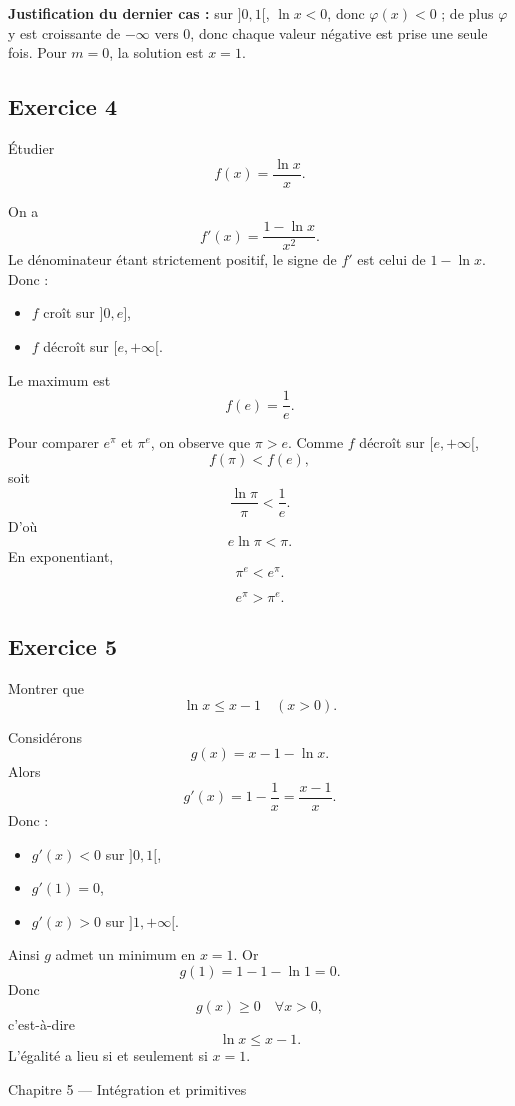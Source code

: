 \documentclass[11pt,a4paper]{article}
\begin{document}
\textbf{Justification du dernier cas :}  
sur \(]0,1[\), \(\ln x<0\), donc \(\varphi(x)<0\) ; de plus \(\varphi\) y est croissante de \(-\infty\) vers \(0\), donc chaque valeur négative est prise une seule fois. Pour \(m=0\), la solution est \(x=1\).

\subsection*{Exercice 4}
Étudier
\[
f(x)=\frac{\ln x}{x}.
\]

On a
\[
f'(x)=\frac{1-\ln x}{x^2}.
\]
Le dénominateur étant strictement positif, le signe de \(f'\) est celui de \(1-\ln x\).  
Donc :
\begin{itemize}
    \item \(f\) croît sur \(]0,e]\),
    \item \(f\) décroît sur \([e,+\infty[\).
\end{itemize}
Le maximum est
\[
f(e)=\frac1e.
\]

Pour comparer \(e^\pi\) et \(\pi^e\), on observe que \(\pi>e\).  
Comme \(f\) décroît sur \([e,+\infty[\),
\[
f(\pi)<f(e),
\]
soit
\[
\frac{\ln\pi}{\pi}<\frac1e.
\]
D'où
\[
e\ln\pi<\pi.
\]
En exponentiant,
\[
\pi^e<e^\pi.
\]

\[
\boxed{e^\pi>\pi^e.}
\]

\subsection*{Exercice 5}
Montrer que
\[
\ln x\leq x-1 \quad (x>0).
\]

Considérons
\[
g(x)=x-1-\ln x.
\]
Alors
\[
g'(x)=1-\frac1x=\frac{x-1}{x}.
\]
Donc :
\begin{itemize}
    \item \(g'(x)<0\) sur \(]0,1[\),
    \item \(g'(1)=0\),
    \item \(g'(x)>0\) sur \(]1,+\infty[\).
\end{itemize}
Ainsi \(g\) admet un minimum en \(x=1\). Or
\[
g(1)=1-1-\ln 1=0.
\]
Donc
\[
g(x)\geq 0 \quad \forall x>0,
\]
c'est-à-dire
\[
\boxed{\ln x\leq x-1.}
\]
L'égalité a lieu si et seulement si \(x=1\).

\begin{chapitrebox}{Chapitre 5 --- Intégration et primitives}
\end{chapitrebox}
\end{document}
